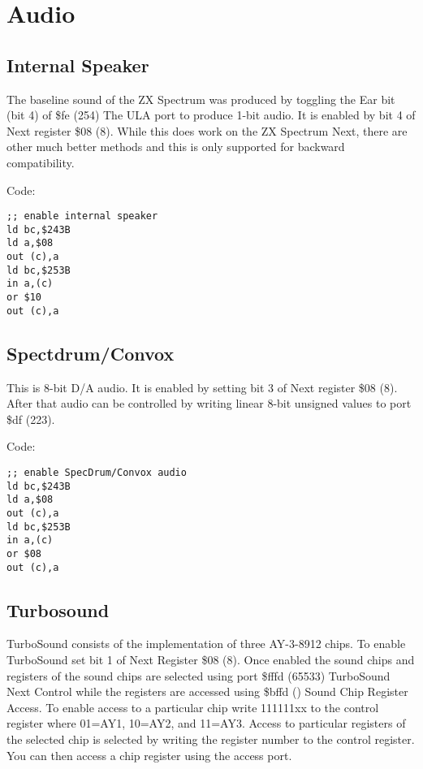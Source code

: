 \section{Audio}
\subsection{Internal Speaker}

The baseline sound of the ZX Spectrum was produced by toggling the Ear
bit (bit 4) of \$fe (254) The ULA port to produce 1-bit audio.  It is
enabled by bit 4 of Next register \$08 (8).  While this does work on
the ZX Spectrum Next, there are other much better methods and this is
only supported for backward compatibility.

Code:
\begin{verbatim}
;; enable internal speaker
ld bc,$243B
ld a,$08
out (c),a
ld bc,$253B
in a,(c)
or $10
out (c),a
\end{verbatim}

\subsection{Spectdrum/Convox}

This is 8-bit D/A audio.  It is enabled by setting bit 3 of Next
register \$08 (8).  After that audio can be controlled by writing
linear 8-bit unsigned values to port \$df (223).

Code:
\begin{verbatim}
;; enable SpecDrum/Convox audio
ld bc,$243B
ld a,$08
out (c),a
ld bc,$253B
in a,(c)
or $08
out (c),a
\end{verbatim}

\subsection{Turbosound}

TurboSound consists of the implementation of three AY-3-8912 chips. To
enable TurboSound set bit 1 of Next Register \$08 (8). Once enabled
the sound chips and registers of the sound chips are selected using
port \$fffd (65533) TurboSound Next Control while the registers are
accessed using \$bffd () Sound Chip Register Access.  To enable access
to a particular chip write 111111xx to the control register where
01=AY1, 10=AY2, and 11=AY3.  Access to particular registers of the
selected chip is selected by writing the register number to the
control register. You can then access a chip register using the access
port.

